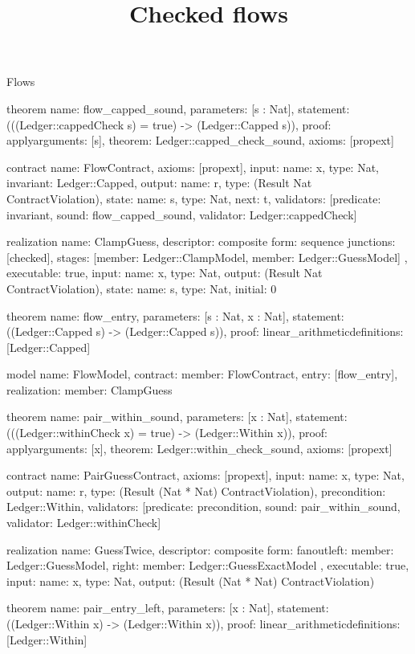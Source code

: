 \begin{lexlean}{Flows}
\title{Checked flows}
\begin{semanticmodule}
theorem{
  name: flow_capped_sound,
  parameters: [s : Nat],
  statement: (((Ledger::cappedCheck s) = true) -> (Ledger::Capped s)),
  proof: apply{arguments: [s], theorem: Ledger::capped_check_sound},
  axioms: [propext]
}

contract{
  name: FlowContract,
  axioms: [propext],
  input: {name: x, type: Nat},
  invariant: Ledger::Capped,
  output: {name: r, type: (Result Nat ContractViolation)},
  state: {name: s, type: Nat, next: t},
  validators: [{predicate: invariant, sound: flow_capped_sound, validator: Ledger::cappedCheck}]
}

realization{
  name: ClampGuess,
  descriptor: composite{
    form: sequence{
      junctions: [checked{}],
      stages: [{member: Ledger::ClampModel}, {member: Ledger::GuessModel}]
    }
  },
  executable: true,
  input: {name: x, type: Nat},
  output: (Result Nat ContractViolation),
  state: {name: s, type: Nat, initial: 0}
}

theorem{
  name: flow_entry,
  parameters: [s : Nat, x : Nat],
  statement: ((Ledger::Capped s) -> (Ledger::Capped s)),
  proof: linear_arithmetic{definitions: [Ledger::Capped]}
}

model{
  name: FlowModel,
  contract: {member: FlowContract},
  entry: [flow_entry],
  realization: {member: ClampGuess}
}

theorem{
  name: pair_within_sound,
  parameters: [x : Nat],
  statement: (((Ledger::withinCheck x) = true) -> (Ledger::Within x)),
  proof: apply{arguments: [x], theorem: Ledger::within_check_sound},
  axioms: [propext]
}

contract{
  name: PairGuessContract,
  axioms: [propext],
  input: {name: x, type: Nat},
  output: {name: r, type: (Result (Nat * Nat) ContractViolation)},
  precondition: Ledger::Within,
  validators: [{predicate: precondition, sound: pair_within_sound, validator: Ledger::withinCheck}]
}

realization{
  name: GuessTwice,
  descriptor: composite{
    form: fanout{left: {member: Ledger::GuessModel}, right: {member: Ledger::GuessExactModel}}
  },
  executable: true,
  input: {name: x, type: Nat},
  output: (Result (Nat * Nat) ContractViolation)
}

theorem{
  name: pair_entry_left,
  parameters: [x : Nat],
  statement: ((Ledger::Within x) -> (Ledger::Within x)),
  proof: linear_arithmetic{definitions: [Ledger::Within]}
}


\end{semanticmodule}
\end{lexlean}
